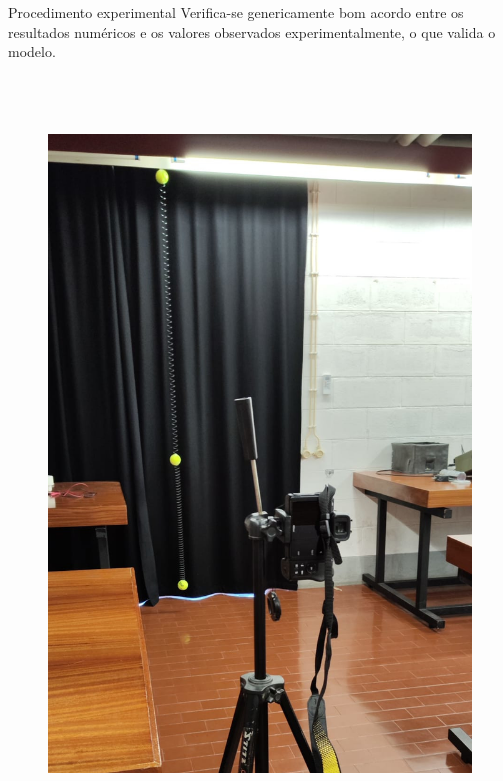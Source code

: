 \documentclass[final]{beamer}
\newlength{\colwidth}
\begin{document}
\begin{frame}[t]
\begin{columns}[t]
\begin{column}{\colwidth}
\begin{block}{Procedimento experimental}
Verifica-se genericamente bom acordo entre os resultados numéricos e os valores
observados experimentalmente, o que valida o modelo.
\begin{center}
\begin{figure}
\includegraphics[height=20cm]{images/semJoao.jpeg}
\hspace{3cm}

\end{figure}
\end{center}
\end{block}
\end{column}
\end{columns}
\end{frame}
\end{document}
